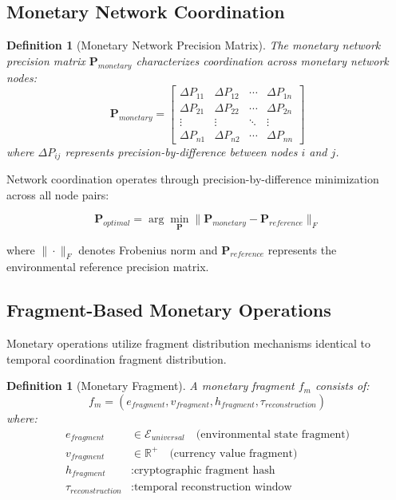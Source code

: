 \documentclass[12pt,a4paper]{article}
\newtheorem{definition}[theorem]{Definition}
\begin{document}
\subsection{Monetary Network Coordination}

\begin{definition}[Monetary Network Precision Matrix]
The monetary network precision matrix $\mathbf{P}_{monetary}$ characterizes coordination across monetary network nodes:
\begin{equation}
\mathbf{P}_{monetary} = \begin{bmatrix}
\Delta P_{11} & \Delta P_{12} & \cdots & \Delta P_{1n} \\
\Delta P_{21} & \Delta P_{22} & \cdots & \Delta P_{2n} \\
\vdots & \vdots & \ddots & \vdots \\
\Delta P_{n1} & \Delta P_{n2} & \cdots & \Delta P_{nn}
\end{bmatrix}
\end{equation}
where $\Delta P_{ij}$ represents precision-by-difference between nodes $i$ and $j$.
\end{definition}

Network coordination operates through precision-by-difference minimization across all node pairs:

\begin{equation}
\mathbf{P}_{optimal} = \arg\min_{\mathbf{P}} \|\mathbf{P}_{monetary} - \mathbf{P}_{reference}\|_F
\end{equation}

where $\|\cdot\|_F$ denotes Frobenius norm and $\mathbf{P}_{reference}$ represents the environmental reference precision matrix.

\subsection{Fragment-Based Monetary Operations}

Monetary operations utilize fragment distribution mechanisms identical to temporal coordination fragment distribution.

\begin{definition}[Monetary Fragment]
A monetary fragment $f_m$ consists of:
\begin{equation}
f_m = (e_{fragment}, v_{fragment}, h_{fragment}, \tau_{reconstruction})
\end{equation}
where:
\begin{align}
e_{fragment} &\in \mathcal{E}_{universal} \quad \text{(environmental state fragment)} \\
v_{fragment} &\in \mathbb{R}^+ \quad \text{(currency value fragment)} \\
h_{fragment} &: \text{cryptographic fragment hash} \\
\tau_{reconstruction} &: \text{temporal reconstruction window}
\end{align}
\end{definition}
\end{document}
